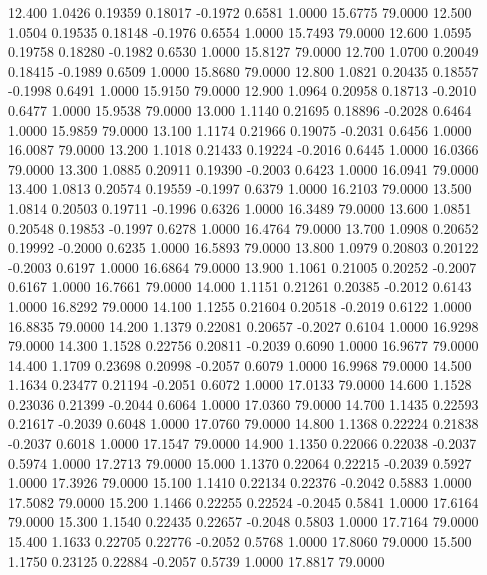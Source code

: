   12.400   1.0426   0.19359   0.18017  -0.1972   0.6581   1.0000  15.6775  79.0000
  12.500   1.0504   0.19535   0.18148  -0.1976   0.6554   1.0000  15.7493  79.0000
  12.600   1.0595   0.19758   0.18280  -0.1982   0.6530   1.0000  15.8127  79.0000
  12.700   1.0700   0.20049   0.18415  -0.1989   0.6509   1.0000  15.8680  79.0000
  12.800   1.0821   0.20435   0.18557  -0.1998   0.6491   1.0000  15.9150  79.0000
  12.900   1.0964   0.20958   0.18713  -0.2010   0.6477   1.0000  15.9538  79.0000
  13.000   1.1140   0.21695   0.18896  -0.2028   0.6464   1.0000  15.9859  79.0000
  13.100   1.1174   0.21966   0.19075  -0.2031   0.6456   1.0000  16.0087  79.0000
  13.200   1.1018   0.21433   0.19224  -0.2016   0.6445   1.0000  16.0366  79.0000
  13.300   1.0885   0.20911   0.19390  -0.2003   0.6423   1.0000  16.0941  79.0000
  13.400   1.0813   0.20574   0.19559  -0.1997   0.6379   1.0000  16.2103  79.0000
  13.500   1.0814   0.20503   0.19711  -0.1996   0.6326   1.0000  16.3489  79.0000
  13.600   1.0851   0.20548   0.19853  -0.1997   0.6278   1.0000  16.4764  79.0000
  13.700   1.0908   0.20652   0.19992  -0.2000   0.6235   1.0000  16.5893  79.0000
  13.800   1.0979   0.20803   0.20122  -0.2003   0.6197   1.0000  16.6864  79.0000
  13.900   1.1061   0.21005   0.20252  -0.2007   0.6167   1.0000  16.7661  79.0000
  14.000   1.1151   0.21261   0.20385  -0.2012   0.6143   1.0000  16.8292  79.0000
  14.100   1.1255   0.21604   0.20518  -0.2019   0.6122   1.0000  16.8835  79.0000
  14.200   1.1379   0.22081   0.20657  -0.2027   0.6104   1.0000  16.9298  79.0000
  14.300   1.1528   0.22756   0.20811  -0.2039   0.6090   1.0000  16.9677  79.0000
  14.400   1.1709   0.23698   0.20998  -0.2057   0.6079   1.0000  16.9968  79.0000
  14.500   1.1634   0.23477   0.21194  -0.2051   0.6072   1.0000  17.0133  79.0000
  14.600   1.1528   0.23036   0.21399  -0.2044   0.6064   1.0000  17.0360  79.0000
  14.700   1.1435   0.22593   0.21617  -0.2039   0.6048   1.0000  17.0760  79.0000
  14.800   1.1368   0.22224   0.21838  -0.2037   0.6018   1.0000  17.1547  79.0000
  14.900   1.1350   0.22066   0.22038  -0.2037   0.5974   1.0000  17.2713  79.0000
  15.000   1.1370   0.22064   0.22215  -0.2039   0.5927   1.0000  17.3926  79.0000
  15.100   1.1410   0.22134   0.22376  -0.2042   0.5883   1.0000  17.5082  79.0000
  15.200   1.1466   0.22255   0.22524  -0.2045   0.5841   1.0000  17.6164  79.0000
  15.300   1.1540   0.22435   0.22657  -0.2048   0.5803   1.0000  17.7164  79.0000
  15.400   1.1633   0.22705   0.22776  -0.2052   0.5768   1.0000  17.8060  79.0000
  15.500   1.1750   0.23125   0.22884  -0.2057   0.5739   1.0000  17.8817  79.0000
